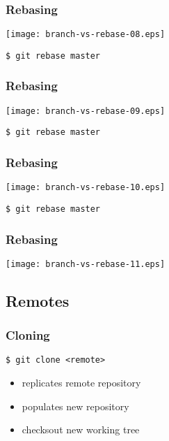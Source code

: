 \documentclass[english]{beamer}
\newcommand{\mysubsection}[2]{%
  \hypertarget{#2}{}%
  \subsection{#1}%
  \label{#2}%
}
\newcommand{\CMD}[1]{%
\texttt{\textcolor{code-green}{#1}}%
}
\newcommand{\green}[1]{%
\textcolor{code-green}{#1}%
}
\begin{document}
\begin{frame}
\frametitle{Rebasing}

\texttt{[image: branch-vs-rebase-08.eps]}
\vspace{\baselineskip}
\begin{flushright}
        \CMD{\$ git rebase master}
\end{flushright}
\vspace{\textheight}
\end{frame}

\begin{frame}
\frametitle{Rebasing}

\texttt{[image: branch-vs-rebase-09.eps]}
\vspace{\baselineskip}
\begin{flushright}
        \CMD{\$ git rebase master}
\end{flushright}
\vspace{\textheight}
\end{frame}

\begin{frame}
\frametitle{Rebasing}

\texttt{[image: branch-vs-rebase-10.eps]}
\vspace{\baselineskip}
\begin{flushright}
        \CMD{\$ git rebase master}
\end{flushright}
\vspace{\textheight}
\end{frame}

\begin{frame}
\frametitle{Rebasing}

\texttt{[image: branch-vs-rebase-11.eps]}
\vspace{\textheight}
\end{frame}

\mysubsection{Remotes}{using:remotes}

\begin{frame}
\frametitle{Cloning}

\CMD{\$ git clone <remote>} \\
\begin{itemize}
        \item replicates \green{remote} repository
        \item populates new repository
        \item checksout new working tree
\end{itemize}
\end{frame}
\end{document}
